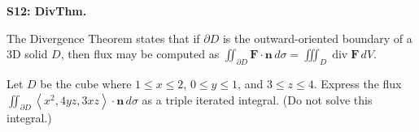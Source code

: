 \documentclass[12pt]{article}
\newcommand{\vect}{\mathbf}
\newcommand{\<}{\left\langle}
\renewcommand{\>}{\right\rangle}
\newcommand{\dv}{\operatorname{div}}
\newcommand{\exerciseHeader}[4]{


  \vspace{0.5em}
  \textbf{#2}
  \vspace{0.5em}

}
\begin{document}
\begin{multicols}{2}
\exerciseHeader{2017 July 25}{S12: DivThm.}{
Apply the Divergence Theorem.
}{}

The Divergence Theorem states that if \(\partial D\) is the outward-oriented
boundary of a 3D solid \(D\),
then flux may be computed as \(\iint_{\partial D}\vect F\cdot\vect{n}\,d\sigma=
\iiint_D\dv\vect F\,dV\).

Let \(D\) be the cube where \(1\leq x\leq 2\),  \(0\leq y\leq 1\),
and \(3\leq z\leq 4\).
Express the flux
\(\iint_{\partial D} \<x^2,4yz,3xz\>\cdot \vect{n}\,d\sigma\) as a triple
iterated integral. (Do not solve this integral.)
\end{multicols}
\end{document}

